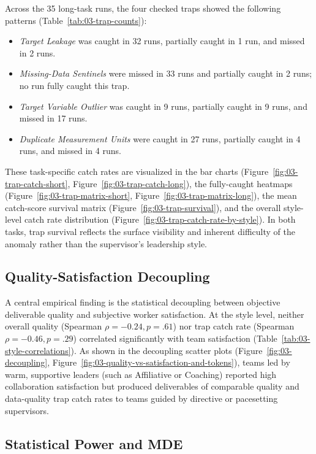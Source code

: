 Across the 35 long-task runs, the four checked traps showed the following patterns (Table~\ref{tab:03-trap-counts}):
\begin{itemize}
    \item \textit{Target Leakage} was caught in 32 runs, partially caught in 1 run, and missed in 2 runs.
    \item \textit{Missing-Data Sentinels} were missed in 33 runs and partially caught in 2 runs; no run fully caught this trap.
    \item \textit{Target Variable Outlier} was caught in 9 runs, partially caught in 9 runs, and missed in 17 runs.
    \item \textit{Duplicate Measurement Units} were caught in 27 runs, partially caught in 4 runs, and missed in 4 runs.
\end{itemize}

These task-specific catch rates are visualized in the bar charts (Figure~\ref{fig:03-trap-catch-short}, Figure~\ref{fig:03-trap-catch-long}), the fully-caught heatmaps (Figure~\ref{fig:03-trap-matrix-short}, Figure~\ref{fig:03-trap-matrix-long}), the mean catch-score survival matrix (Figure~\ref{fig:03-trap-survival}), and the overall style-level catch rate distribution (Figure~\ref{fig:03-trap-catch-rate-by-style}).
In both tasks, trap survival reflects the surface visibility and inherent difficulty of the anomaly rather than the supervisor's leadership style.

\subsection{Quality-Satisfaction Decoupling}
\label{subsec:quality-satisfaction-decoupling}

A central empirical finding is the statistical decoupling between objective deliverable quality and subjective worker satisfaction.
At the style level, neither overall quality (Spearman $\rho = -0.24, p = .61$) nor trap catch rate (Spearman $\rho = -0.46, p = .29$) correlated significantly with team satisfaction (Table~\ref{tab:03-style-correlations}).
As shown in the decoupling scatter plots (Figure~\ref{fig:03-decoupling}, Figure~\ref{fig:03-quality-vs-satisfaction-and-tokens}), teams led by warm, supportive leaders (such as Affiliative or Coaching) reported high collaboration satisfaction but produced deliverables of comparable quality and data-quality trap catch rates to teams guided by directive or pacesetting supervisors.

\subsection{Statistical Power and MDE}
\label{subsec:statistical-power-mde}

